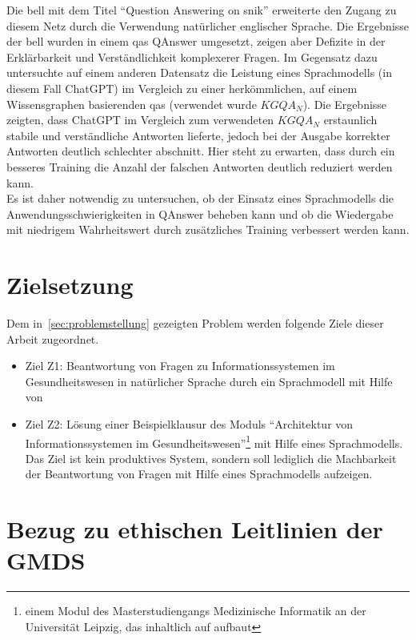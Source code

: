 Die \ac{bell} mit dem Titel \enquote{Question Answering on \ac{snik}} \citep{hannesbell, hannesbell_skill} erweiterte den Zugang zu diesem Netz durch die Verwendung natürlicher englischer Sprache.
Die Ergebnisse der \ac{bell} wurden in einem \ac{qas} QAnswer \citep{qanswer} umgesetzt, zeigen aber Defizite in der Erklärbarkeit und Verständlichkeit komplexerer Fragen.
Im Gegensatz dazu untersuchte \citet{chatgpt_qas} auf einem anderen Datensatz die Leistung eines Sprachmodells (in diesem Fall ChatGPT) im Vergleich zu einer herkömmlichen, auf einem Wissensgraphen basierenden \ac{qas} (verwendet wurde $KGQA_N$).
Die Ergebnisse zeigten, dass ChatGPT im Vergleich zum verwendeten $KGQA_N$ erstaunlich stabile und verständliche Antworten lieferte, jedoch bei der Ausgabe korrekter Antworten deutlich schlechter abschnitt. Hier steht zu erwarten, dass durch ein besseres Training die Anzahl der falschen Antworten deutlich reduziert werden kann.\\

Es ist daher notwendig zu untersuchen, ob der Einsatz eines Sprachmodells die Anwendungsschwierigkeiten in QAnswer beheben kann und ob die Wiedergabe mit niedrigem Wahrheitswert durch zusätzliches Training verbessert werden kann.

\section{Zielsetzung}\label{sec:zielsetzung}

Dem in~\cref{sec:problemstellung} gezeigten Problem werden folgende Ziele dieser Arbeit zugeordnet.
\begin{itemize}
  \item Ziel Z1: Beantwortung von Fragen zu Informationssystemen im Gesundheitswesen in natürlicher Sprache durch ein Sprachmodell mit Hilfe von \citet{bb}
  \item Ziel Z2: Lösung einer Beispielklausur des Moduls \enquote{Architektur von Informationssystemen im Gesundheitswesen}\footnote{\raggedright{}einem Modul des Masterstudiengangs Medizinische Informatik an der Universität Leipzig, das inhaltlich auf \citet{bb} aufbaut} mit Hilfe eines Sprachmodells.\@
        Das Ziel ist kein produktives System, sondern soll lediglich die Machbarkeit der Beantwortung von Fragen mit Hilfe eines Sprachmodells aufzeigen.
\end{itemize}

\section{Bezug zu ethischen Leitlinien der GMDS}\label{sec:gmds_ethik}

